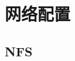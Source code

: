 
\chapter{网络配置}
\label{chap:networkConfiguration}

\section{NFS}
\label{sec:networkConfiguration:networkFileSystem}


